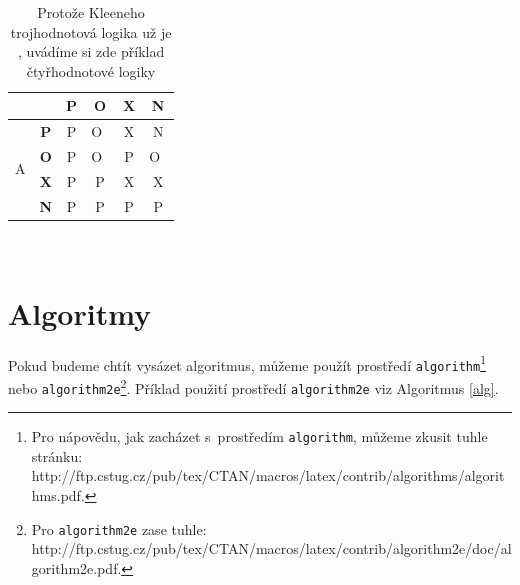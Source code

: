 \documentclass[11pt,a4paper]{article}
\begin{document}
\begin{table}[h]
\begin{tabular}{|c|c|c|c|c|c|}
		\multicolumn{2}{|c|}{}                   & \textbf{P}    & \textbf{O}   & \textbf{X}   & \textbf{N}   \\ \hline
		\multirow{4}{*}{A}          & \textbf{P}          & P    & O~& X   & N   \\ \cline{2-6} 
		& \textbf{O}          & P    & O~& P   & O~\\ \cline{2-6} 
		& \textbf{X}          & P    & P   & X   & X   \\ \cline{2-6} 
		& \textbf{N}          & P    & P   & P   & P   \\ \hline
	\end{tabular}
\caption{Protože Kleeneho trojhodnotová logika už je , uvádíme si zde příklad čtyřhodnotové logiky}
\label{logika}
\end{table}\\ \pagebreak
		
			\section{Algoritmy}\label{sec3}
			Pokud budeme chtít vysázet algoritmus, můžeme použít prostředí \texttt{algorithm}\footnote{Pro nápovědu, jak zacházet s~prostředím \verb|algorithm|, můžeme zkusit tuhle stránku:\\ http://ftp.cstug.cz/pub/tex/CTAN/macros/latex/contrib/algorithms/algorithms.pdf.} nebo \texttt{algorithm2e}\footnote{Pro \enspace\verb|algorithm2e| zase tuhle: http://ftp.cstug.cz/pub/tex/CTAN/macros/latex/contrib/algorithm2e/doc/algorithm2e.pdf.}.\linebreak
			\noindent Příklad použití prostředí \verb|algorithm2e| viz Algoritmus \ref{alg}.\\
			
\end{document}
